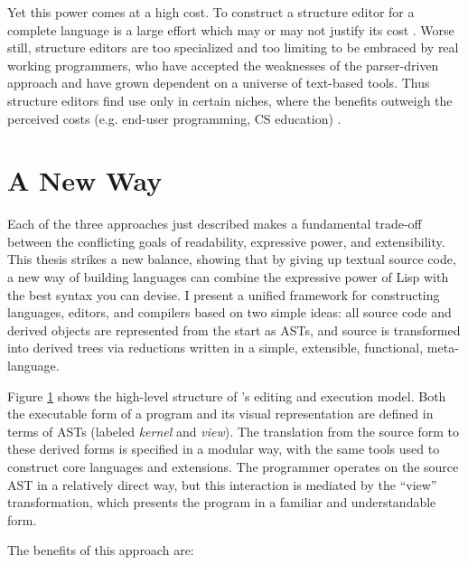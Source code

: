 Yet this power comes at a high cost. To construct a structure editor for a complete language is a large effort which may or may not justify its cost \cite{lang}. Worse still, structure editors are too specialized and too limiting to be embraced by real working programmers, who have accepted the weaknesses of the parser-driven approach and have grown dependent on a universe of text-based tools. Thus structure editors find use only in certain niches, where the benefits outweigh the perceived costs (e.g. end-user programming, CS education) \cite{alice}.

%
%
\section{A New Way}

Each of the three approaches just described makes a fundamental trade-off between the conflicting goals of readability, expressive power, and extensibility. This thesis strikes a new balance, showing that by giving up textual source code, a new way of building languages can combine the expressive power of Lisp with the best syntax you can devise. I present a unified framework for constructing languages, editors, and compilers based on two simple ideas: all source code and derived objects are represented from the start as ASTs, and source is transformed into derived trees via reductions written in a simple, extensible, functional, meta-language.

\begin{figure}[th]
  \centering


  \caption{\Meta}
  \label{fig-2}
\end{figure}

Figure \ref{fig-2} shows the high-level structure of \Meta's editing and execution model. Both the executable form of a program and its visual representation are defined in terms of ASTs (labeled \emph{kernel} and \emph{view}). The translation from the source form to these derived forms is specified in a modular way, with the same tools used to construct core languages and extensions. The programmer operates on the source AST in a relatively direct way, but this interaction is mediated by the ``view'' transformation, which presents the program in a familiar and understandable form.

The benefits of this approach are:

